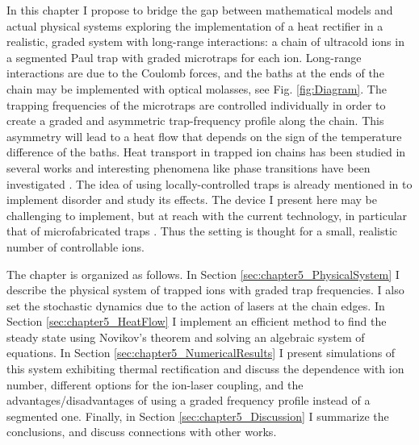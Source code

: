 In this chapter I propose to bridge the gap between mathematical models and actual physical systems exploring the implementation of a heat rectifier in a realistic, graded system with long-range interactions:
a chain of ultracold ions in a segmented Paul trap with graded microtraps for each ion. Long-range interactions are due to the Coulomb forces, and the  baths at the ends of the chain  may be implemented with optical molasses,
see Fig. \ref{fig:Diagram}. The trapping frequencies of the  microtraps are controlled individually in order to create a graded and asymmetric trap-frequency profile along the chain. This asymmetry will lead to a heat flow that depends on the sign of the temperature difference of the baths. Heat transport in trapped ion chains has been studied in several works  \cite{Freitas2015,Ruiz2014,Ruiz2019,Pruttivarasin2011,Ramm2014} and interesting phenomena like phase transitions have been investigated \cite{Freitas2015,Ruiz2014,Ruiz2019,Pruttivarasin2011}. The idea of using locally-controlled traps is already mentioned in \cite{Freitas2015} to implement disorder and study its effects. The device I present here may be challenging to implement, but at reach with the current technology, in particular  that of microfabricated traps \cite{Cirac2000,Krauth2014,Schmied2009}. Thus the setting is thought for a small, realistic number of controllable ions.

The chapter is organized as follows. In Section \ref{sec:chapter5_PhysicalSystem} I describe the physical system of trapped ions with graded trap frequencies. I also set the stochastic dynamics due to the action of lasers at the chain edges.
In Section \ref{sec:chapter5_HeatFlow}  I implement an efficient  method to find the steady state using Novikov's theorem and solving an algebraic system of equations. In Section \ref{sec:chapter5_NumericalResults} I present simulations of this system exhibiting thermal rectification and discuss the dependence with ion number, different options for the ion-laser coupling, and the advantages/disadvantages of using a graded frequency profile instead of a segmented one. Finally, in Section \ref{sec:chapter5_Discussion} I summarize the conclusions, and discuss connections with other works.
%
%
%
